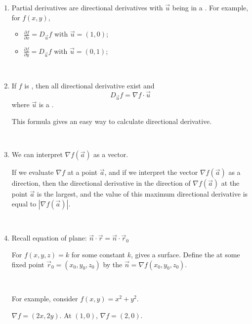 \documentclass[11pt,fleqn]{book} %
\begin{document}
\begin{enumerate}
    \item Partial derivatives are directional derivatives with $\vec{u}$ being in a . For example, for $f(x,y)$, 

    \begin{itemize}
        \item $\frac{\partial f}{\partial x} = D_{\vec{u}} f$ with $\vec{u} = (1, 0)$;
        \item $\frac{\partial f}{\partial y} = D_{\vec{u}} f$ with $\vec{u} = (0, 1)$;
    \end{itemize}

    {~~~}

    \item If $f$ is , then all directional derivative exist and $$D_{\vec{u}} f = \nabla f \cdot \vec{u}$$ where $\vec{u}$ is a . 
    
    This formula gives an easy way to calculate directional derivative.

    {~~~}

    \item We can interpret $\nabla f(\vec{a})$ as a vector. 
    
    If we evaluate $\nabla f$ at a point $\vec{a}$, and if we interpret the vector $\nabla f(\vec{a})$ as a direction, then the directional derivative in the direction of $\nabla f(\vec{a})$ at the point $\vec{a}$ is the largest, and the value of this maximum directional derivative is equal to $| \nabla f(\vec{a}) |$. 

    {~~~}

    \item Recall equation of plane: $\vec{n} \cdot \vec{r} = \vec{n} \cdot \vec{r}_0$
    
    For $f(x, y, z) = k$ for some constant $k$, gives a  surface. Define the  at some fixed point $\vec{r}_0 = (x_0, y_0, z_0)$ by the  $\vec{n} = \nabla f(x_0, y_0, z_0)$.

    {~~~}

    For example, consider $f(x,y) = x^2 + y^2$. 

    $\nabla f = (2x, 2y)$. At $(1,0)$, $\nabla f = (2,0)$. 

    \begin{center}
\end{center}
\end{enumerate}
\end{document}
